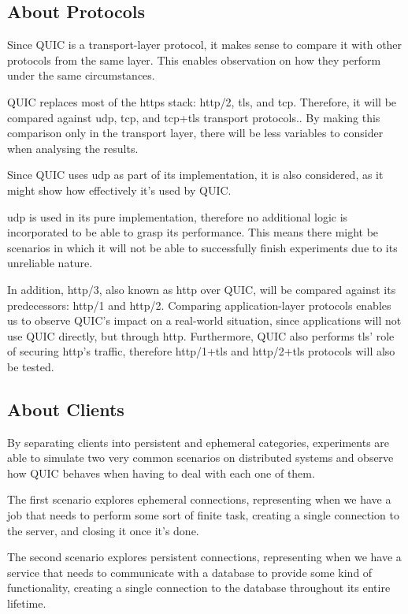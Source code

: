 \subsection{About Protocols}

Since QUIC is a transport-layer protocol, it makes sense to compare it with other protocols from the same layer. This enables observation on how they perform under the same circumstances.

QUIC replaces most of the \gls{https} stack: \gls{http}/2, \gls{tls}, and \gls{tcp}. Therefore, it will be compared against \gls{udp}, \gls{tcp}, and \gls{tcp}+\gls{tls} transport protocols.. By making this comparison only in the transport layer, there will be less variables to consider when analysing the results.

Since QUIC uses \gls{udp} as part of its implementation, it is also considered, as it might show how effectively it’s used by QUIC.

\gls{udp} is used in its pure implementation, therefore no additional logic is incorporated to be able to grasp its performance. This means there might be scenarios in which it will not be able to successfully finish experiments due to its unreliable nature.

In addition, \gls{http}/3, also known as \gls{http} over QUIC, will be compared against its predecessors: \gls{http}/1 and \gls{http}/2. Comparing application-layer protocols enables us to observe QUIC’s impact on a real-world situation, since applications will not use QUIC directly, but through \gls{http}. Furthermore, QUIC also performs \gls{tls}’ role of securing \gls{http}’s traffic, therefore \gls{http}/1+\gls{tls} and \gls{http}/2+\gls{tls} protocols will also be tested.

\subsection{About Clients}

By separating clients into persistent and ephemeral categories, experiments are able to simulate two very common scenarios on distributed systems and observe how QUIC behaves when having to deal with each one of them.

The first scenario explores ephemeral connections, representing when we have a job that needs to perform some sort of finite task, creating a single connection to the server, and closing it once it’s done.

The second scenario explores persistent connections, representing when we have a service that needs to communicate with a database to provide some kind of functionality, creating a single connection to the database throughout its entire lifetime.

